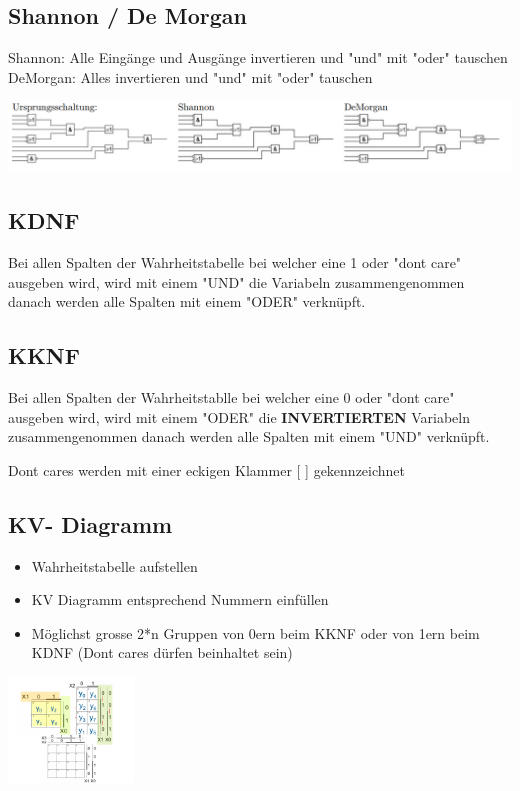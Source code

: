 \documentclass[10pt]{article}
\begin{document}
    \subsection{Shannon / De Morgan}
    Shannon: Alle Eingänge und Ausgänge invertieren und "und" mit "oder" tauschen \\
    DeMorgan: Alles invertieren und "und" mit "oder" tauschen
    \begin{center}
        \includegraphics[width=\textwidth]{Shannon_DeMorgan.PNG}
    \end{center}
\begin{multicols}{2}
\subsection{KDNF}
Bei allen Spalten der Wahrheitstabelle bei welcher eine 1 oder "dont care" ausgeben wird, wird mit einem "UND" die Variabeln zusammengenommen danach werden alle Spalten mit einem "ODER" verknüpft.
\columnbreak
\subsection{KKNF}
Bei allen Spalten der Wahrheitstablle bei welcher eine 0 oder "dont care" ausgeben wird, wird mit einem "ODER" die \textbf{INVERTIERTEN} Variabeln zusammengenommen danach werden alle Spalten mit einem "UND" verknüpft.
\end{multicols}
Dont cares werden mit einer eckigen Klammer [ ] gekennzeichnet
\begin{multicols}{2}
    \subsection{KV- Diagramm}
\begin{itemize}
    \item Wahrheitstabelle aufstellen
    \item KV Diagramm entsprechend Nummern einfüllen
    \item Möglichst grosse 2*n Gruppen von 0ern beim KKNF oder von 1ern beim KDNF (Dont cares dürfen beinhaltet sein)
\end{itemize}

\columnbreak
\begin{center}
    \includegraphics[width=0.25\textwidth]{KV006.png}
\end{center}
\end{multicols}
\end{document}
